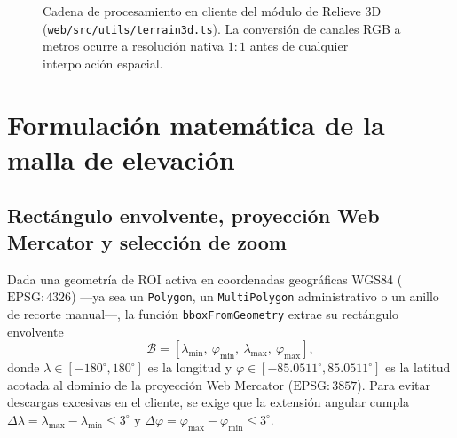 \documentclass[11pt,a4paper]{article}
\newcommand{\src}[1]{\nolinkurl{#1}}
\begin{document}
\begin{figure}[htbp]
\centering
{}
\caption{Cadena de procesamiento en cliente del módulo de Relieve 3D (\src{web/src/utils/terrain3d.ts}).
La conversión de canales RGB a metros ocurre a resolución nativa $1:1$ antes de cualquier interpolación
espacial.}
\label{fig:flujo-relieve3d}
\end{figure}

\section{Formulación matemática de la malla de elevación}
\label{sec:relieve3d-matematicas}

\subsection{Rectángulo envolvente, proyección Web Mercator y selección de zoom}
\label{sec:relieve3d-mercator}

Dada una geometría de ROI activa en coordenadas geográficas WGS84 ($\mathrm{EPSG}{:}4326$) ---ya sea un
\texttt{Polygon}, un \texttt{MultiPolygon} administrativo o un anillo de recorte manual---, la función
\texttt{bboxFromGeometry} extrae su rectángulo envolvente
\begin{equation}
  \mathcal{B} = [\lambda_{\min},\ \varphi_{\min},\ \lambda_{\max},\ \varphi_{\max}],
  \label{eq:bbox-relieve}
\end{equation}
donde $\lambda\in[-180^\circ,180^\circ]$ es la longitud y $\varphi\in[-85.0511^\circ,85.0511^\circ]$ es la
latitud acotada al dominio de la proyección Web Mercator ($\mathrm{EPSG}{:}3857$). Para evitar descargas
excesivas en el cliente, se exige que la extensión angular cumpla
$\Delta\lambda = \lambda_{\max}-\lambda_{\min}\le 3^\circ$ y
$\Delta\varphi = \varphi_{\max}-\varphi_{\min}\le 3^\circ$.
\end{document}
